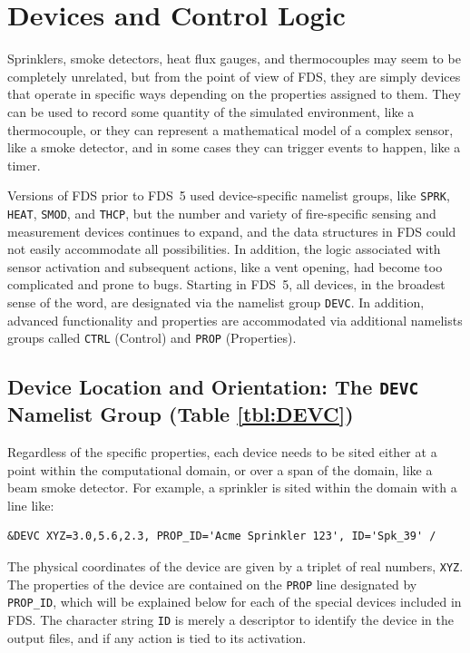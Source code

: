 \documentclass[11pt]{book}
\newcommand{\ct}{\tt\small}
\begin{document}
\chapter{Devices and Control Logic}

Sprinklers, smoke detectors, heat flux gauges, and thermocouples
may seem to be completely unrelated, but from the point of view
of FDS, they are simply devices that operate in specific ways depending
on the properties assigned to them. They can be used to record some
quantity of the simulated environment, like a thermocouple, or they can represent a mathematical model
of a complex sensor, like a smoke detector,
and in some cases they can trigger events to happen, like a timer.

Versions of FDS prior to FDS~5 used device-specific namelist groups, like {\ct SPRK},
{\ct HEAT}, {\ct SMOD}, and {\ct THCP}, but the number and variety
of fire-specific sensing and measurement devices continues to expand, and
the data structures in FDS could not easily accommodate all possibilities.
In addition, the logic associated with sensor activation and
subsequent actions, like a vent opening, had become too complicated and prone to bugs.
Starting in FDS~5, all devices, in the broadest sense of the word,
are designated via the namelist group {\ct DEVC}.
In addition, advanced functionality and properties are accommodated
via additional namelists groups called {\ct CTRL} (Control) and
{\ct PROP} (Properties).




\section{Device Location and Orientation: The \texorpdfstring{{\tt DEVC}}{DEVC} Namelist Group (Table \ref{tbl:DEVC})}
\label{info:DEVC}

Regardless of the specific properties, each device needs to be sited either at a point within the computational domain, or
over a span of the domain, like a beam smoke detector. For example, a sprinkler is sited within the domain with a line like:

\footnotesize
\begin{verbatim}
&DEVC XYZ=3.0,5.6,2.3, PROP_ID='Acme Sprinkler 123', ID='Spk_39' /
\end{verbatim}
\normalsize

\noindent
The physical coordinates of the
device are given by a triplet of real numbers, {\ct XYZ}.
The properties of the device are contained on the {\ct PROP} line
designated by {\ct PROP\_ID}, which will be explained below for each of the
special devices included in FDS.
The character string {\ct ID} is merely a descriptor to identify the
device in the output files, and if any action is tied to its activation.
\end{document}
